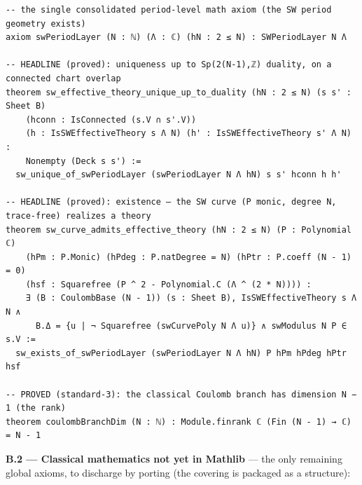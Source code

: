 \documentclass[11pt]{article}
\begin{document}
\begin{Verbatim}
-- the single consolidated period-level math axiom (the SW period geometry exists)
axiom swPeriodLayer (N : ℕ) (Λ : ℂ) (hN : 2 ≤ N) : SWPeriodLayer N Λ

-- HEADLINE (proved): uniqueness up to Sp(2(N-1),ℤ) duality, on a connected chart overlap
theorem sw_effective_theory_unique_up_to_duality (hN : 2 ≤ N) (s s' : Sheet B)
    (hconn : IsConnected (s.V ∩ s'.V))
    (h : IsSWEffectiveTheory s Λ N) (h' : IsSWEffectiveTheory s' Λ N) :
    Nonempty (Deck s s') :=
  sw_unique_of_swPeriodLayer (swPeriodLayer N Λ hN) s s' hconn h h'

-- HEADLINE (proved): existence — the SW curve (P monic, degree N, trace-free) realizes a theory
theorem sw_curve_admits_effective_theory (hN : 2 ≤ N) (P : Polynomial ℂ)
    (hPm : P.Monic) (hPdeg : P.natDegree = N) (hPtr : P.coeff (N - 1) = 0)
    (hsf : Squarefree (P ^ 2 - Polynomial.C (Λ ^ (2 * N)))) :
    ∃ (B : CoulombBase (N - 1)) (s : Sheet B), IsSWEffectiveTheory s Λ N ∧
      B.Δ = {u | ¬ Squarefree (swCurvePoly N Λ u)} ∧ swModulus N P ∈ s.V :=
  sw_exists_of_swPeriodLayer (swPeriodLayer N Λ hN) P hPm hPdeg hPtr hsf

-- PROVED (standard-3): the classical Coulomb branch has dimension N − 1 (the rank)
theorem coulombBranchDim (N : ℕ) : Module.finrank ℂ (Fin (N - 1) → ℂ) = N - 1
\end{Verbatim}

\medskip
\noindent\textbf{B.2 --- Classical mathematics not yet in Mathlib} --- the only remaining global
axioms, to discharge by porting (the covering is packaged as a structure):
\end{document}
